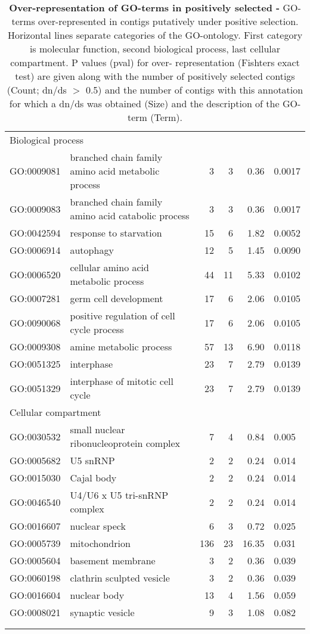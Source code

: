 \begin{longtable}{lp{5cm}rrrl}
   \hline
   \multicolumn{6}{l}{Biological process}  \\ 
   GO:0009081 & branched chain family amino acid metabolic process &   3 &   3 & 0.36 & 0.0017 \\ 
  GO:0009083 & branched chain family amino acid catabolic process &   3 &   3 & 0.36 & 0.0017 \\ 
  GO:0042594 & response to starvation &  15 &   6 & 1.82 & 0.0052 \\ 
  GO:0006914 & autophagy &  12 &   5 & 1.45 & 0.0090 \\ 
  GO:0006520 & cellular amino acid metabolic process &  44 &  11 & 5.33 & 0.0102 \\ 
  GO:0007281 & germ cell development &  17 &   6 & 2.06 & 0.0105 \\ 
  GO:0090068 & positive regulation of cell cycle process &  17 &   6 & 2.06 & 0.0105 \\ 
  GO:0009308 & amine metabolic process &  57 &  13 & 6.90 & 0.0118 \\ 
  GO:0051325 & interphase &  23 &   7 & 2.79 & 0.0139 \\ 
  GO:0051329 & interphase of mitotic cell cycle &  23 &   7 & 2.79 & 0.0139 \\ 
  \hline
  \multicolumn{6}{l}{Cellular compartment}  \\ 
  GO:0030532 & small nuclear ribonucleoprotein complex &   7 &   4 & 0.84 & 0.005 \\ 
  GO:0005682 & U5 snRNP &   2 &   2 & 0.24 & 0.014 \\ 
  GO:0015030 & Cajal body &   2 &   2 & 0.24 & 0.014 \\ 
  GO:0046540 & U4/U6 x U5 tri-snRNP complex &   2 &   2 & 0.24 & 0.014 \\ 
  GO:0016607 & nuclear speck &   6 &   3 & 0.72 & 0.025 \\ 
  GO:0005739 & mitochondrion & 136 &  23 & 16.35 & 0.031 \\ 
  GO:0005604 & basement membrane &   3 &   2 & 0.36 & 0.039 \\ 
  GO:0060198 & clathrin sculpted vesicle &   3 &   2 & 0.36 & 0.039 \\ 
  GO:0016604 & nuclear body &  13 &   4 & 1.56 & 0.059 \\ 
  GO:0008021 & synaptic vesicle &   9 &   3 & 1.08 & 0.082 \\ 
\hline\\
\caption[Over-representation of GO-terms in positively
selected]{\textbf{Over-representation of GO-terms in positively
    selected -} GO-terms over-represented in contigs putatively under
  positive selection. Horizontal lines separate categories of the
  GO-ontology. First category is molecular function, second biological
  process, last cellular compartment. P values (pval) for over-
  representation (Fishters exact test) are given along with the number
  of positively selected contigs (Count; dn/ds $>$ 0.5) and the number
  of contigs with this annotation for which a dn/ds was obtained
  (Size) and the
  description of the GO-term (Term).}
\label{go-pos}\\
\end{longtable}


